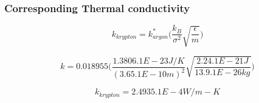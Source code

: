 \documentclass{article}
\begin{document}
\subsubsection{Corresponding Thermal conductivity}
\label{sec-4-4-4}
$$k_{krypton} = k^*_{argon}\Big(\frac{k_B}{\sigma^2}\sqrt{\frac{\epsilon}{m}}\Big)$$

$$k = 0.018955 \Big(\frac{1.3806.1E-23J/K}{(3.65.1E-10 m)^2}\sqrt{\frac{2.24.1E-21J}{13.9.1E-26 kg}}\Big) $$

$$\boxed{k_{krypton} = 2.4935.1E-4   W/m-K} $$




\end{document}
